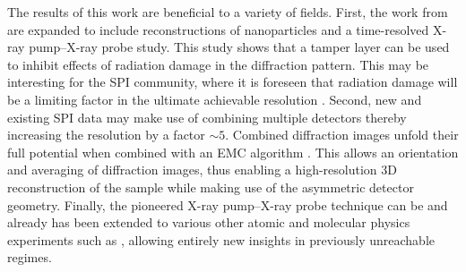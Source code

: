 %
The results of this work are beneficial to a variety of fields. First, the work from \citep{Hoener-2008-JPB,Gorkhover-2016-NatPho} are expanded to include reconstructions of nanoparticles and a time-resolved X-ray pump--X-ray probe study. This study shows that a tamper layer can be used to inhibit effects of radiation damage in the diffraction pattern. This may be interesting for the SPI community, where it is foreseen that radiation damage will be a limiting factor in the ultimate achievable resolution \citep{Aquila-2015-StrucDyn}. Second, new and existing SPI data may make use of combining multiple detectors thereby increasing the resolution by a factor $\sim 5$. Combined diffraction images unfold their full potential when combined with an EMC algorithm \citep{Loh-2009-PRE}. This allows an orientation and averaging of diffraction images, thus enabling a high-resolution 3D reconstruction of the sample while making use of the asymmetric detector geometry. Finally, the pioneered X-ray pump--X-ray probe technique can be and already has been extended to various other atomic and molecular physics experiments such as \citep{Picon-2016-NatComm,Lehmann-2016-PRA,Kimberg-2016-FD,Al-Haddad-2017-unpublished,Ferguson-2016-SciAdv}, allowing entirely new insights in previously unreachable regimes.
%
%
%